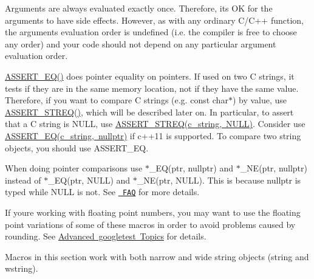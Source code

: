 Arguments are always evaluated exactly once. Therefore, it\textquotesingle{}s OK for the arguments to have side effects. However, as with any ordinary C/\+C++ function, the arguments\textquotesingle{} evaluation order is undefined (i.\+e. the compiler is free to choose any order) and your code should not depend on any particular argument evaluation order.

{\ttfamily \mbox{\hyperlink{googletest-master_2googletest_2include_2gtest_2gtest_8h_a1a6db8b1338ee7040329322b77779086}{A\+S\+S\+E\+R\+T\+\_\+\+E\+Q()}}} does pointer equality on pointers. If used on two C strings, it tests if they are in the same memory location, not if they have the same value. Therefore, if you want to compare C strings (e.\+g. {\ttfamily const char$\ast$}) by value, use {\ttfamily \mbox{\hyperlink{googletest-master_2googletest_2include_2gtest_2gtest_8h_a74f4189ea570bab9a65d47104659ef9c}{A\+S\+S\+E\+R\+T\+\_\+\+S\+T\+R\+E\+Q()}}}, which will be described later on. In particular, to assert that a C string is {\ttfamily N\+U\+LL}, use {\ttfamily \mbox{\hyperlink{_obj__test_2lib_2googletest-release-1_88_81_2googletest_2include_2gtest_2gtest_8h_a74f4189ea570bab9a65d47104659ef9c}{A\+S\+S\+E\+R\+T\+\_\+\+S\+T\+R\+E\+Q(c\+\_\+string, N\+U\+L\+L)}}}. Consider use {\ttfamily \mbox{\hyperlink{_obj__test_2lib_2googletest-release-1_88_81_2googletest_2include_2gtest_2gtest_8h_a1a6db8b1338ee7040329322b77779086}{A\+S\+S\+E\+R\+T\+\_\+\+E\+Q(c\+\_\+string, nullptr)}}} if c++11 is supported. To compare two {\ttfamily string} objects, you should use {\ttfamily A\+S\+S\+E\+R\+T\+\_\+\+EQ}.

When doing pointer comparisons use {\ttfamily $\ast$\+\_\+\+EQ(ptr, nullptr)} and {\ttfamily $\ast$\+\_\+\+NE(ptr, nullptr)} instead of {\ttfamily $\ast$\+\_\+\+EQ(ptr, N\+U\+LL)} and {\ttfamily $\ast$\+\_\+\+NE(ptr, N\+U\+LL)}. This is because {\ttfamily nullptr} is typed while {\ttfamily N\+U\+LL} is not. See \href{faq.md\#why-does-google-test-support-expect_eqnull-ptr-and-assert_eqnull-ptr-but-not-expect_nenull-ptr-and-assert_nenull-ptr}{\texttt{ F\+AQ}} for more details.

If you\textquotesingle{}re working with floating point numbers, you may want to use the floating point variations of some of these macros in order to avoid problems caused by rounding. See \mbox{\hyperlink{_obj__test_2lib_2googletest-release-1_88_81_2googletest_2docs_2advanced_8md}{Advanced googletest Topics}} for details.

Macros in this section work with both narrow and wide string objects ({\ttfamily string} and {\ttfamily wstring}).

